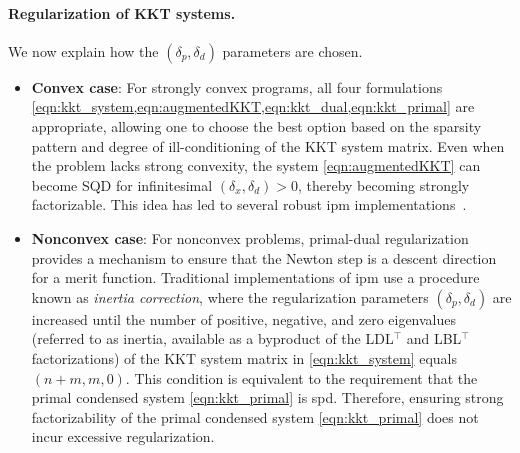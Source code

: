 \documentclass{article}
\begin{document}
\paragraph{Regularization of KKT systems.}
We now explain how the $(\delta_p, \delta_d)$ parameters are chosen.
\begin{itemize}[leftmargin=*,itemsep=0pt,parsep=0pt,partopsep=0pt]
\item \textbf{Convex case}:
For strongly convex programs, all four formulations \cref{eqn:kkt_system,eqn:augmentedKKT,eqn:kkt_dual,eqn:kkt_primal} are appropriate, allowing one to choose the best option based on the sparsity pattern and degree of ill-conditioning of the KKT system matrix. Even when the problem lacks strong convexity, the system \cref{eqn:augmentedKKT} can become SQD for infinitesimal $(\delta_x, \delta_d) > 0$, thereby becoming strongly factorizable. This idea has led to several robust \gls{ipm} implementations~\cite{friedlanderPrimalDualRegularized2012}.
\item \textbf{Nonconvex case}:
For nonconvex problems, primal-dual regularization provides a mechanism to ensure that the Newton step is a descent direction for a merit function. Traditional implementations of \gls{ipm} use a procedure known as \emph{inertia correction}, where the regularization parameters $(\delta_p, \delta_d)$ are increased until the number of positive, negative, and zero eigenvalues (referred to as inertia, available as a byproduct of the LDL$^\top$ and LBL$^\top$ factorizations) of the KKT system matrix in \cref{eqn:kkt_system} equals $(n+m, m, 0)$. This condition is equivalent to the requirement that the primal condensed system \cref{eqn:kkt_primal} is \gls*{spd}. Therefore, ensuring strong factorizability of the primal condensed system \cref{eqn:kkt_primal} does not incur excessive regularization.

\end{itemize}
\end{document}
